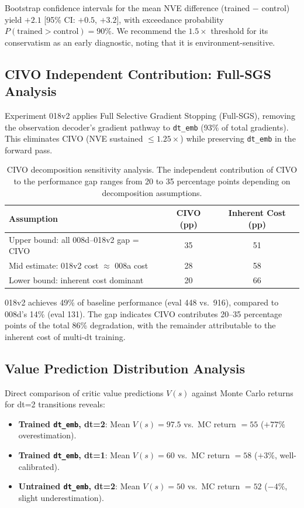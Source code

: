 \documentclass[10pt,letterpaper]{article}
\begin{document}
Bootstrap confidence intervals for the mean NVE difference (trained $-$ control) yield $+2.1$ [95\% CI: $+0.5$, $+3.2$], with exceedance probability $P(\text{trained} > \text{control}) = 90\%$.
We recommend the $1.5\times$ threshold for its conservatism as an early diagnostic, noting that it is environment-sensitive.

\subsection{CIVO Independent Contribution: Full-SGS Analysis}
\label{sec:sgs}

Experiment 018v2 applies Full Selective Gradient Stopping (Full-SGS), removing the observation decoder's gradient pathway to \texttt{dt\_emb} (93\% of total gradients).
This eliminates CIVO (NVE sustained $\leq 1.25\times$) while preserving \texttt{dt\_emb} in the forward pass.

\begin{table}[h]
\centering
\caption{CIVO decomposition sensitivity analysis. The independent contribution of CIVO to the performance gap ranges from 20 to 35 percentage points depending on decomposition assumptions.}
\label{tab:civo_decomposition}
\begin{tabular}{lcc}
\toprule
Assumption & CIVO (pp) & Inherent Cost (pp) \\
\midrule
Upper bound: all 008d--018v2 gap = CIVO & 35 & 51 \\
Mid estimate: 018v2 cost $\approx$ 008a cost & 28 & 58 \\
Lower bound: inherent cost dominant & 20 & 66 \\
\bottomrule
\end{tabular}
\end{table}

018v2 achieves 49\% of baseline performance (eval 448 vs.\ 916), compared to 008d's 14\% (eval 131).
The gap indicates CIVO contributes 20--35 percentage points of the total 86\% degradation, with the remainder attributable to the inherent cost of multi-dt training.

\subsection{Value Prediction Distribution Analysis}

Direct comparison of critic value predictions $V(s)$ against Monte Carlo returns for dt=2 transitions reveals:

\begin{itemize}
    \item \textbf{Trained \texttt{dt\_emb}, dt=2}: Mean $V(s) = 97.5$ vs.\ MC return $= 55$ ($+77\%$ overestimation).
    \item \textbf{Trained \texttt{dt\_emb}, dt=1}: Mean $V(s) = 60$ vs.\ MC return $= 58$ ($+3\%$, well-calibrated).
    \item \textbf{Untrained \texttt{dt\_emb}, dt=2}: Mean $V(s) = 50$ vs.\ MC return $= 52$ ($-4\%$, slight underestimation).
\end{itemize}
\end{document}
